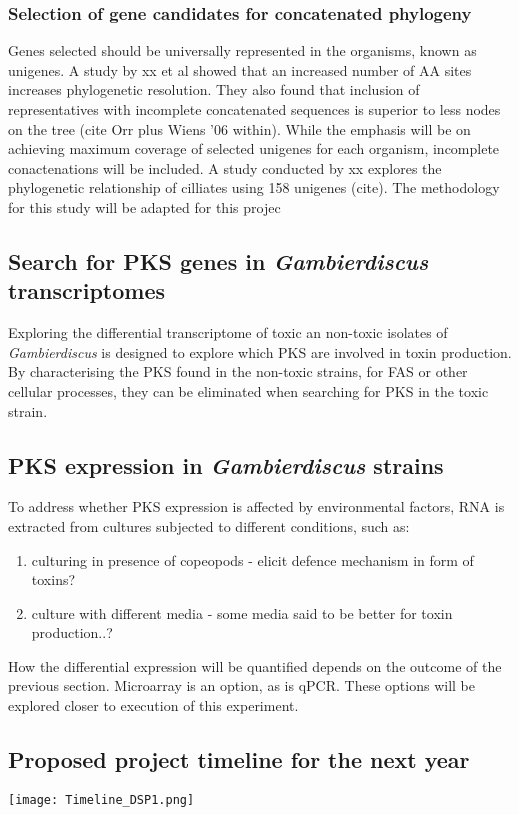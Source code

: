 \documentclass[12pt]{article}
\begin{document}
\subsubsection{Selection of gene candidates for concatenated phylogeny}
Genes selected should be universally represented in the organisms, known as unigenes. A study by xx et al showed that an increased number of AA sites increases phylogenetic resolution. They also found that inclusion of representatives with incomplete concatenated sequences is superior to less nodes on the tree (cite Orr plus Wiens '06 within). While the emphasis will be on achieving maximum coverage of selected unigenes for each organism, incomplete conactenations will be included.
A study conducted by xx explores the phylogenetic relationship of cilliates using 158 unigenes (cite). The methodology for this study will be adapted for this projec


\subsection{Search for PKS genes in \emph{Gambierdiscus} transcriptomes}
Exploring the differential transcriptome of toxic an non-toxic isolates of \emph{Gambierdiscus} is designed to explore which PKS are involved in toxin production. By characterising the PKS found in the non-toxic strains, for FAS or other cellular processes, they can be eliminated when searching for PKS in the toxic strain. 

\subsection{PKS expression in \emph{Gambierdiscus} strains}
To address whether PKS expression is affected by environmental factors, RNA is extracted from cultures subjected to different conditions, such as: 
\begin{enumerate}
\item culturing in presence of copeopods - elicit defence mechanism in form of toxins?
\item culture with different media - some media said to be better for toxin production..?
\end{enumerate}
How the differential expression will be quantified depends on the outcome of the previous section. Microarray is an option, as is qPCR. These options will be explored closer to execution of this experiment.
\subsection{Proposed project timeline for the next year} 


\texttt{[image: Timeline\_DSP1.png]}

\newpage


\end{document}

